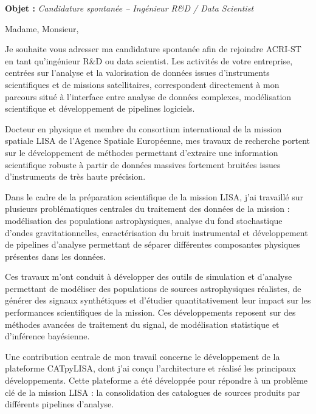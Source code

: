 \documentclass[11pt,a4paper]{altacv}
\begin{document}
\makecvheader
\vspace{-0.5cm}
\vspace{-0.3cm}

{\color{accent}\textbf{Objet :}} \textit{Candidature spontanée -- Ingénieur R\&D / Data Scientist}

{\color{body}

Madame, Monsieur,

Je souhaite vous adresser ma candidature spontanée afin de rejoindre ACRI-ST en tant qu'ingénieur R\&D ou data scientist. Les activités de votre entreprise, centrées sur l'analyse et la valorisation de données issues d'instruments scientifiques et de missions satellitaires, correspondent directement à mon parcours situé à l'interface entre analyse de données complexes, modélisation scientifique et développement de pipelines logiciels.

Docteur en physique et membre du consortium international de la mission spatiale LISA de l'Agence Spatiale Européenne, mes travaux de recherche portent sur le développement de méthodes permettant d'extraire une information scientifique robuste à partir de données massives fortement bruitées issues d'instruments de très haute précision.

Dans le cadre de la préparation scientifique de la mission LISA, j'ai travaillé sur plusieurs problématiques centrales du traitement des données de la mission : modélisation des populations astrophysiques, analyse du fond stochastique d'ondes gravitationnelles, caractérisation du bruit instrumental et développement de pipelines d'analyse permettant de séparer différentes composantes physiques présentes dans les données.

Ces travaux m'ont conduit à développer des outils de simulation et d'analyse permettant de modéliser des populations de sources astrophysiques réalistes, de générer des signaux synthétiques et d'étudier quantitativement leur impact sur les performances scientifiques de la mission. Ces développements reposent sur des méthodes avancées de traitement du signal, de modélisation statistique et d'inférence bayésienne.

Une contribution centrale de mon travail concerne le développement de la plateforme CATpyLISA, dont j'ai conçu l'architecture et réalisé les principaux développements. Cette plateforme a été développée pour répondre à un problème clé de la mission LISA : la consolidation des catalogues de sources produits par différents pipelines d'analyse.

}
\end{document}
